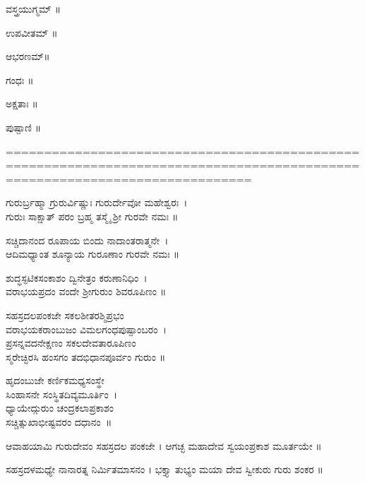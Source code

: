 ವಸ್ತ್ರಯುಗ್ಮಮ್ ॥

 ಉಪವೀತಮ್ ॥

ಆಭರಣಮ್॥

ಗಂಧಃ ॥

ಅಕ್ಷತಾಃ ॥

ಪುಷ್ಪಾಣಿ ॥


============================================================================================================================




ಗುರುರ್ಬ್ರಹ್ಮಾ ಗ್ರುರುರ್ವಿಷ್ಣುಃ ಗುರುರ್ದೇವೋ ಮಹೇಶ್ವರಃ~।\\
ಗುರುಃ ಸಾಕ್ಷಾತ್ ಪರಂ ಬ್ರಹ್ಮ ತಸ್ಮೈ ಶ್ರೀ ಗುರವೇ ನಮಃ ॥

ಸಚ್ಚಿದಾನಂದ ರೂಪಾಯ ಬಿಂದು ನಾದಾಂತರಾತ್ಮನೇ~।\\
ಆದಿಮಧ್ಯಾಂತ ಶೂನ್ಯಾಯ ಗುರೂಣಾಂ ಗುರವೇ ನಮಃ ॥

ಶುದ್ಧಸ್ಫಟಿಕಸಂಕಾಶಂ ದ್ವಿನೇತ್ರಂ ಕರುಣಾನಿಧಿಂ~।\\
ವರಾಭಯಪ್ರದಂ ವಂದೇ ಶ್ರೀಗುರುಂ ಶಿವರೂಪಿಣಂ ॥

ಸಹಸ್ರದಲಪಂಕಜೇ ಸಕಲಶೀತರಶ್ಮಿಪ್ರಭಂ\\
ವರಾಭಯಕರಾಂಬುಜಂ ವಿಮಲಗಂಧಪುಷ್ಪಾಂಬರಂ~।\\
ಪ್ರಸನ್ನವದನೇಕ್ಷಣಂ ಸಕಲದೇವತಾರೂಪಿಣಂ\\
ಸ್ಮರೇಚ್ಛಿರಸಿ ಹಂಸಗಂ ತದಭಿಧಾನಪೂರ್ವಂ ಗುರುಂ ॥


ಹೃದಂಬುಜೇ ಕರ್ಣಿಕಮಧ್ಯಸಂಸ್ಥೇ\\ ಸಿಂಹಾಸನೇ ಸಂಸ್ಥಿತದಿವ್ಯಮೂರ್ತಿಂ~।\\
ಧ್ಯಾಯೇದ್ಗುರುಂ ಚಂದ್ರಕಲಾಪ್ರಕಾಶಂ\\ ಸಚ್ಚಿತ್ಸುಖಾಭೀಷ್ಟವರಂ ದಧಾನಂ~॥

ಆವಾಹಯಾಮಿ ಗುರುದೇವಂ ಸಹಸ್ರದಲ ಪಂಕಜೇ ।
ಆಗಚ್ಛ ಮಹಾದೇವ ಸ್ವಯಂಪ್ರಕಾಶ ಮೂರ್ತಯೇ ॥

ಸಹಸ್ರದಳಮಧ್ಯೇ ನಾನಾರತ್ನ ನಿರ್ಮಿತಮಾಸನಂ ।
ಭಕ್ತ್ಯಾ ತುಭ್ಯಂ ಮಯಾ ದೇವ ಸ್ವೀಕುರು ಗುರು ಶಂಕರ ॥

